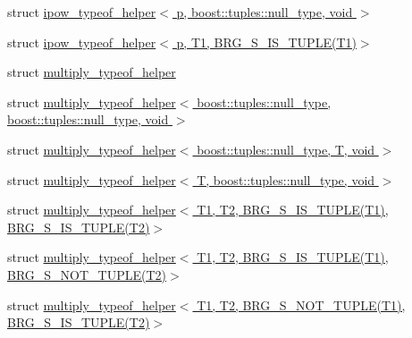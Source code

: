 \begin{DoxyCompactItemize}
\item 
struct \hyperlink{namespaceIceBRG_1_1tuples_structIceBRG_1_1tuples_1_1ipow__typeof__helper_3_01p_00_01boost_1_1tuples_1_1null__type_00_01void_01_4}{ipow\+\_\+typeof\+\_\+helper$<$ p, boost\+::tuples\+::null\+\_\+type, void $>$}
\item 
struct \hyperlink{namespaceIceBRG_1_1tuples_structIceBRG_1_1tuples_1_1ipow__typeof__helper_3_01p_00_01T1_00_01BRG__S__IS__TUPLE_07T1_08_4}{ipow\+\_\+typeof\+\_\+helper$<$ p, T1, B\+R\+G\+\_\+\+S\+\_\+\+I\+S\+\_\+\+T\+U\+P\+L\+E(\+T1)$>$}
\item 
struct \hyperlink{namespaceIceBRG_1_1tuples_structIceBRG_1_1tuples_1_1multiply__typeof__helper}{multiply\+\_\+typeof\+\_\+helper}
\item 
struct \hyperlink{namespaceIceBRG_1_1tuples_structIceBRG_1_1tuples_1_1multiply__typeof__helper_3_01boost_1_1tuples_1_1null__type_00_01boost_3879c0d85d6ebd176aeb832142f492bd}{multiply\+\_\+typeof\+\_\+helper$<$ boost\+::tuples\+::null\+\_\+type, boost\+::tuples\+::null\+\_\+type, void $>$}
\item 
struct \hyperlink{namespaceIceBRG_1_1tuples_structIceBRG_1_1tuples_1_1multiply__typeof__helper_3_01boost_1_1tuples_1_1null__type_00_01T_00_01void_01_4}{multiply\+\_\+typeof\+\_\+helper$<$ boost\+::tuples\+::null\+\_\+type, T, void $>$}
\item 
struct \hyperlink{namespaceIceBRG_1_1tuples_structIceBRG_1_1tuples_1_1multiply__typeof__helper_3_01T_00_01boost_1_1tuples_1_1null__type_00_01void_01_4}{multiply\+\_\+typeof\+\_\+helper$<$ T, boost\+::tuples\+::null\+\_\+type, void $>$}
\item 
struct \hyperlink{namespaceIceBRG_1_1tuples_structIceBRG_1_1tuples_1_1multiply__typeof__helper_3_01T1_00_01T2_00_01BRG__S__IS__TUPLE_07T1_081d8a4cfcf4cba4b6dba7b46ae822b392}{multiply\+\_\+typeof\+\_\+helper$<$ T1, T2, B\+R\+G\+\_\+\+S\+\_\+\+I\+S\+\_\+\+T\+U\+P\+L\+E(\+T1), B\+R\+G\+\_\+\+S\+\_\+\+I\+S\+\_\+\+T\+U\+P\+L\+E(\+T2)$>$}
\item 
struct \hyperlink{namespaceIceBRG_1_1tuples_structIceBRG_1_1tuples_1_1multiply__typeof__helper_3_01T1_00_01T2_00_01BRG__S__IS__TUPLE_07T1_08d0dac86c84971415068079a4f4319b30}{multiply\+\_\+typeof\+\_\+helper$<$ T1, T2, B\+R\+G\+\_\+\+S\+\_\+\+I\+S\+\_\+\+T\+U\+P\+L\+E(\+T1), B\+R\+G\+\_\+\+S\+\_\+\+N\+O\+T\+\_\+\+T\+U\+P\+L\+E(\+T2)$>$}
\item 
struct \hyperlink{namespaceIceBRG_1_1tuples_structIceBRG_1_1tuples_1_1multiply__typeof__helper_3_01T1_00_01T2_00_01BRG__S__NOT__TUPLE_07T1_0f8b2bfe2074bcff168e50ce88774b3d8}{multiply\+\_\+typeof\+\_\+helper$<$ T1, T2, B\+R\+G\+\_\+\+S\+\_\+\+N\+O\+T\+\_\+\+T\+U\+P\+L\+E(\+T1), B\+R\+G\+\_\+\+S\+\_\+\+I\+S\+\_\+\+T\+U\+P\+L\+E(\+T2)$>$}

\end{DoxyCompactItemize}
